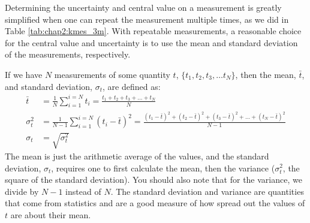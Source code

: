 Determining the uncertainty and central value on a measurement is greatly simplified when one can repeat the measurement multiple times, as we did in Table \ref{tab:chap2:kmes_3m}. With repeatable measurements, a reasonable choice for the central value and uncertainty is to use the mean and standard deviation of the measurements, respectively.

If we have $N$ measurements of some quantity $t$, $\{t_1, t_2, t_3, \dots t_N\}$, then the mean, $\bar t$, and standard deviation, $\sigma_t$, are defined as:
\begin{align}
\bar t &= \frac{1}{N}\sum_{i=1}^{i=N} t_i=\frac{t_1 +t_2 +t_3 +\dots+ t_N}{N} \\
\sigma_t^2 &=\frac{1}{N-1}\sum_{i=1}^{i=N}(t_i-\bar t)^2 = \frac{(t_1-\bar t)^2+(t_2-\bar t)^2+(t_3-\bar t)^2+\dots+(t_N-\bar t)^2}{N-1} \\
\sigma_t &=\sqrt{\sigma_t^2}
\end{align}
The mean is just the arithmetic average of the values, and the standard deviation, $\sigma_t$, requires one to first calculate the mean, then the variance ($\sigma^2_t$, the square of the standard deviation). You should also note that for the variance, we divide by $N-1$ instead of $N$. The standard deviation and variance are quantities that come from statistics and are a good measure of how spread out the values of $t$ are about their mean.

